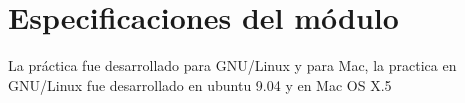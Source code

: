 \section{Especificaciones del módulo }
La práctica fue desarrollado para GNU/Linux y para Mac, la practica en GNU/Linux fue desarrollado en ubuntu 9.04 y en Mac OS X.5


